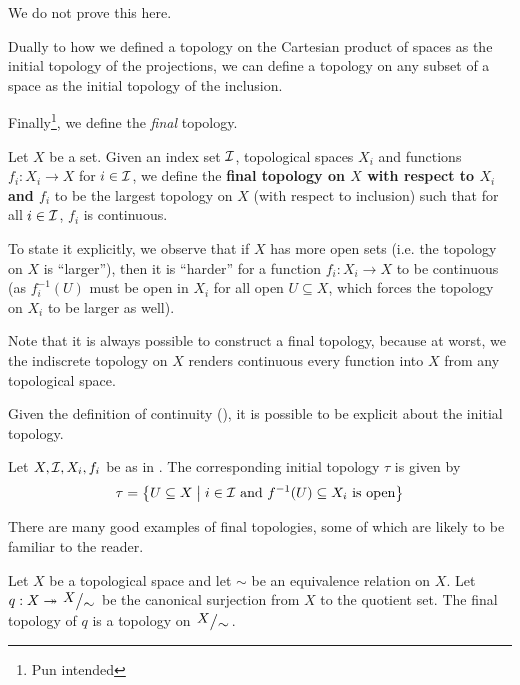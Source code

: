 We do not prove this here.

Dually to how we defined a topology on the Cartesian product of spaces as the initial topology of the projections, we can define a topology on any subset of a space as the initial topology of the inclusion.

Finally\footnote{Pun intended}, we define the \textit{final} topology.

\begin{boxdefinition}\label{Ch1:Def:Final_Top}
    Let $X$ be a set. Given an index set $\mathcal{I}$, topological spaces $X_i$ and functions $f_i : X_i \to X$ for $i \in \mathcal{I}$, we define the \textbf{final topology on $X$ with respect to $X_i$ and $f_i$} to be the largest topology on $X$ (with respect to inclusion) such that for all $i \in \mathcal{I}$, $f_i$ is continuous.
\end{boxdefinition}
\begin{remark}
    To state it explicitly, we observe that if $X$ has more open sets (i.e. the topology on $X$ is ``larger''), then it is ``harder'' for a function $f_i:X_i\to X$ to be continuous (as $f_i^{-1}(U)$ must be open in $X_i$ for all open $U\subseteq X$, which forces the topology on $X_i$ to be larger as well).
\end{remark} %

Note that it is always possible to construct a final topology, because at worst, we the indiscrete topology on $X$ renders continuous every function into $X$ from any topological space.

Given the definition of continuity (), it is possible to be explicit about the initial topology.

\begin{boxlemma}
    Let $X, \mathcal{I}, X_i, f_i$ be as in . The corresponding initial topology $\tau$ is given by
    \begin{align*}
        \tau = \left\{ U \subseteq X \; \middle\vert \; i \in \mathcal{I} \text{ and } f^{-1}(U) \subseteq X_i \text{ is open} \right\}
    \end{align*}
\end{boxlemma}

There are many good examples of final topologies, some of which are likely to be familiar to the reader.

\begin{boxexample}\label{Ch1:Eg:Quot_Top}
    Let $X$ be a topological space and let $\sim$ be an equivalence relation on $X$. Let $q : X \surj \quotient{X}{\sim}$ be the canonical surjection from $X$ to the quotient set. The final topology of $q$ is a topology on $\quotient{X}{\sim}$.
\end{boxexample}

